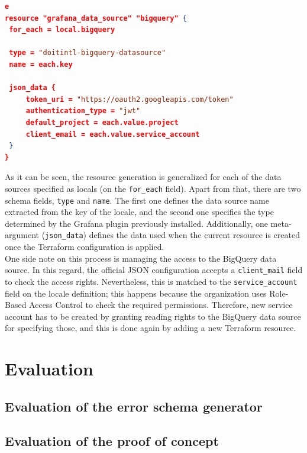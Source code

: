 \documentclass[english, 12pt, a4paper, sci, utf8, a-1b, online]{aaltothesis}
\begin{document}
\begin{lstlisting}[language=json,firstnumber=1]e
resource "grafana_data_source" "bigquery" {
 for_each = local.bigquery
 
 type = "doitintl-bigquery-datasource"
 name = each.key
 
 json_data {
     token_uri = "https://oauth2.googleapis.com/token"
     authentication_type = "jwt"
     default_project = each.value.project
     client_email = each.value.service_account
 }
}
\end{lstlisting}

As it can be seen, the resource generation is generalized for each of the data sources specified as locals (on the \texttt{for\_each} field). Apart from that, there are two schema fields, \texttt{type} and \texttt{name}. The first one defines the data source name extracted from the key of the locale, and the second one specifies the type determined by the Grafana plugin previously installed. Additionally, one meta-argument \cite{TerraformMeta} (\texttt{json\_data}) defines the data used when the current resource is created once the Terraform configuration is applied.\\

One side note on this process is managing the access to the BigQuery data source. In this regard, the official JSON configuration accepts a \texttt{client\_mail} field to check the access rights. Nevertheless, this is matched to the \texttt{service\_account} field on the locale definition; this happens because the organization uses Role-Based Access Control to check the required permissions. Therefore, new service account has to be created by granting reading rights to the BigQuery data source for specifying those, and this is done again by adding a new Terraform resource.

\clearpage
\section{Evaluation}


\subsection{Evaluation of the error schema generator} 


\subsection{Evaluation of the proof of concept}
\end{document}
